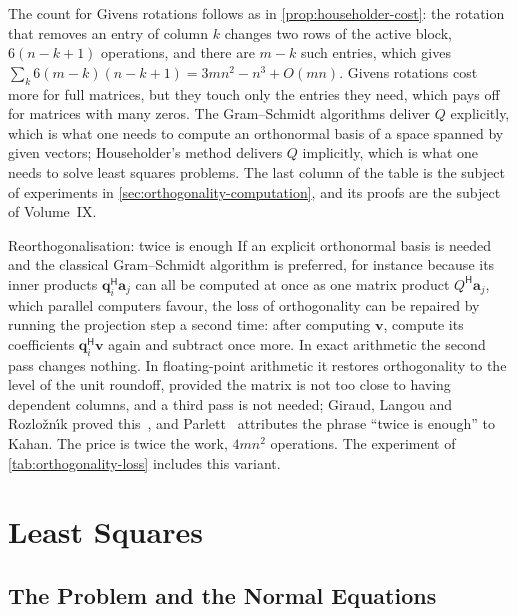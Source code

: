 The count for Givens rotations follows as in \cref{prop:householder-cost}: the rotation that removes an entry of column $k$ changes two rows of the active block, $6(n-k+1)$ operations, and there are $m-k$ such entries, which gives $\sum_k6(m-k)(n-k+1)=3mn^2-n^3+O(mn)$. Givens rotations cost more for full matrices, but they touch only the entries they need, which pays off for matrices with many zeros. The Gram--Schmidt algorithms deliver $Q$ explicitly, which is what one needs to compute an orthonormal basis of a space spanned by given vectors; Householder's method delivers $Q$ implicitly, which is what one needs to solve least squares problems. The last column of the table is the subject of experiments in \cref{sec:orthogonality-computation}, and its proofs are the subject of Volume~IX.

\begin{note}{Reorthogonalisation: twice is enough}
If an explicit orthonormal basis is needed and the classical Gram--Schmidt algorithm is preferred, for instance because its inner products $\mathbf q_i^{\mathsf H}\mathbf a_j$ can all be computed at once as one matrix product $Q^{\mathsf H}\mathbf a_j$, which parallel computers favour, the loss of orthogonality can be repaired by running the projection step a second time: after computing $\mathbf v$, compute its coefficients $\mathbf q_i^{\mathsf H}\mathbf v$ again and subtract once more. In exact arithmetic the second pass changes nothing. In floating-point arithmetic it restores orthogonality to the level of the unit roundoff, provided the matrix is not too close to having dependent columns, and a third pass is not needed; Giraud, Langou and Rozlo\v{z}n\'{\i}k proved this~\cite{giraud2005camwa}, and Parlett~\cite{parlett1998} attributes the phrase ``twice is enough'' to Kahan. The price is twice the work, $4mn^2$ operations. The experiment of \cref{tab:orthogonality-loss} includes this variant.
\end{note}

\section{Least Squares}
\label{sec:least-squares}

\subsection{The Problem and the Normal Equations}


